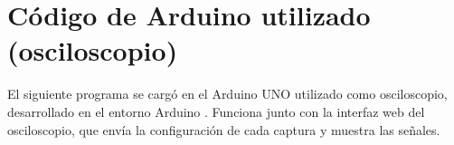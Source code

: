 \documentclass[conference]{IEEEtran}
\begin{document}
\onecolumn
\section*{Código de Arduino utilizado (osciloscopio)}

El siguiente programa se cargó en el Arduino UNO utilizado como osciloscopio, desarrollado en el entorno Arduino \cite{pena}. Funciona junto con la interfaz web del osciloscopio, que envía la configuración de cada captura y muestra las señales.


\end{document}
